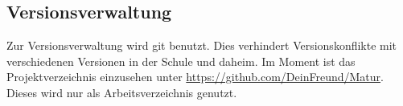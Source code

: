 \documentclass[a4paper]{article}
\begin{document}
\subsection{Versionsverwaltung}
Zur Versionsverwaltung wird git benutzt. Dies verhindert Versionskonflikte mit verschiedenen Versionen in der Schule und daheim. Im Moment ist das Projektverzeichnis einzusehen unter \url{https://github.com/DeinFreund/Matur}. Dieses wird nur als Arbeitsverzeichnis genutzt.
\end{document}
